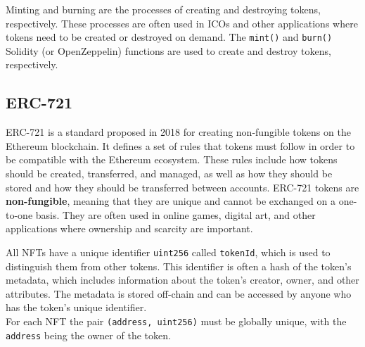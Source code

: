 Minting and burning are the processes of creating and destroying tokens, respectively. These processes are often used in ICOs and other applications where tokens need to be created or destroyed on demand. The \texttt{mint()} and \texttt{burn()} Solidity (or OpenZeppelin) functions are used to create and destroy tokens, respectively.

\subsection{ERC-721}
ERC-721 is a standard proposed in 2018 for creating non-fungible tokens on the Ethereum blockchain. It defines a set of rules that tokens must follow in order to be compatible with the Ethereum ecosystem. These rules include how tokens should be created, transferred, and managed, as well as how they should be stored and how they should be transferred between accounts. ERC-721 tokens are \textbf{non-fungible}, meaning that they are unique and cannot be exchanged on a one-to-one basis. They are often used in online games, digital art, and other applications where ownership and scarcity are important.

All NFTs have a unique identifier \texttt{uint256} called \texttt{tokenId}, which is used to distinguish them from other tokens. This identifier is often a hash of the token's metadata, which includes information about the token's creator, owner, and other attributes. The metadata is stored off-chain and can be accessed by anyone who has the token's unique identifier.\\
For each NFT the pair \texttt{(address, uint256)} must be globally unique, with the \texttt{address} being the owner of the token.

\nl

